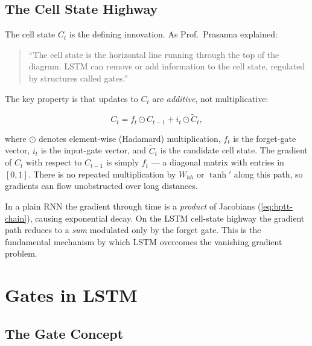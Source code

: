 \documentclass[12pt,a4paper]{article}
\begin{document}
\subsection{The Cell State Highway}
\label{subsec:cell-state}

The cell state $C_t$ is the defining innovation. As Prof.\ Prasanna
explained:

\begin{quote}
``The cell state is the horizontal line running through the top of the
diagram. LSTM can remove or add information to the cell state, regulated by
structures called gates.''
\end{quote}

The key property is that updates to $C_t$ are \emph{additive}, not
multiplicative:

\begin{equation}
  \label{eq:cell-state-update}
  C_t = f_t \odot C_{t-1} + i_t \odot \tilde{C}_t,
\end{equation}

where $\odot$ denotes element-wise (Hadamard) multiplication, $f_t$ is
the forget-gate vector, $i_t$ is the input-gate vector, and $\tilde{C}_t$
is the candidate cell state. The gradient of $C_t$ with respect to
$C_{t-1}$ is simply $f_t$ --- a diagonal matrix with entries in $[0,1]$.
There is no repeated multiplication by $W_{hh}$ or $\tanh'$ along this
path, so gradients can flow unobstructed over long distances.

\begin{keyinsight}[title=Additive Updates Prevent Vanishing Gradients]
  In a plain RNN the gradient through time is a \emph{product} of Jacobians
  (\cref{eq:bptt-chain}), causing exponential decay. On the LSTM cell-state
  highway the gradient path reduces to a \emph{sum} modulated only by the
  forget gate. This is the fundamental mechanism by which LSTM overcomes the
  vanishing gradient problem.
\end{keyinsight}

\section{Gates in LSTM}
\label{sec:gates}

\subsection{The Gate Concept}
\label{subsec:gate-concept}
\end{document}
